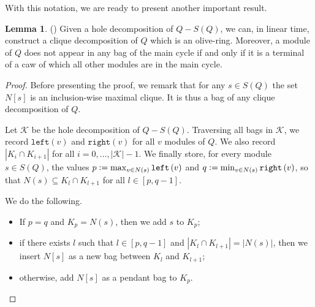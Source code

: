 \documentclass{article}
\theoremstyle{definition}
\newtheorem{lemma}[thm]{Lemma}
\newcommand{\defeq}{\vcentcolon=}
\begin{document}
    With this notation, we are
    ready to present another
    important result.

    \begin{lemma} (\cite{main}) \label{or_2}
        Given a hole decomposition
        of $Q - S\left(Q\right)$,
        we can, in linear time,
        construct a clique decomposition
        of $Q$ which is an olive-ring.
        Moreover, a module of $Q$ 
        does not appear in any
        bag of the main cycle
        if and only if it is
        a terminal of a caw
        of which all other modules are in
        the main cycle.
    \end{lemma}
    \begin{proof}
        Before presenting the proof, 
        we remark that for any $s \in S\left(Q\right)$ 
        the set $N\left[s\right]$ 
        is an inclusion-wise maximal
        clique. It is thus a bag
        of any clique decomposition of $Q$.

        Let $\mathcal{K}$ be the
        hole decomposition of $Q - S\left(Q\right)$.
        Traversing all bags in $\mathcal{K}$,
        we record $\texttt{left}\left(v\right)$ 
        and $\texttt{right}\left(v\right)$ 
        for all $v$ modules of $Q$.
        We also record $\left|K_{i} \cap K_{i+1}\right|$
        for all $i = 0, \ldots, \left|\mathcal{K}\right|-1$.
        We finally store, for every 
        module $s \in S\left(Q\right)$,
        the values $p \defeq \max_{v \in N\left(s\right)} \texttt{left}\left(v\right)$ 
        and $q \defeq \min_{v \in N\left(s\right)} \texttt{right}\left(v\right)$,
        so that $N\left(s\right) \subseteq K_{l} \cap K_{l+1}$ 
        for all $l \in \left[p, q-1\right]$.

        We do the following.
        \begin{itemize}
            \item If $p = q$ and $K_{p} = N\left(s\right)$,
                then we add $s$ to $K_{p}$;
            \item if there exists $l$ 
                such that $l \in \left[p, q-1\right]$ 
                and $\left|K_{l} \cap K_{l+1}\right| = \left|N\left(s\right)\right|$,
                then we insert $N\left[s\right]$
                as a new bag between $K_{l}$ 
                and $K_{l+1}$;
            \item otherwise, add $N\left[s\right]$ 
                as a pendant bag to $K_{p}$.
        \end{itemize}


\end{proof}
\end{document}
